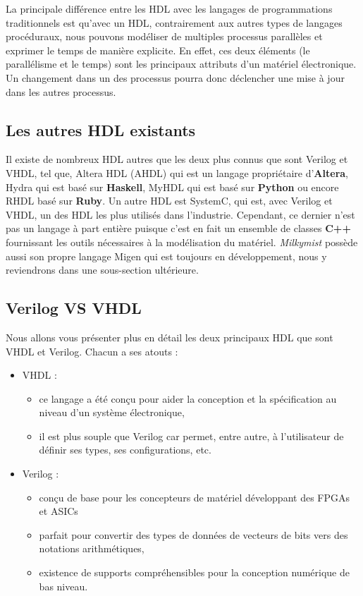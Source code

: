 La principale différence entre les HDL avec les langages de programmations traditionnels est qu'avec un HDL, contrairement aux autres types de langages procéduraux, nous pouvons modéliser de multiples processus parallèles et exprimer le temps de manière explicite. En effet, ces deux éléments (le parallélisme et le temps) sont les principaux attributs d'un matériel électronique. Un changement dans un des processus pourra donc déclencher une mise à jour dans les autres processus.

\subsection{Les autres HDL existants}
Il existe de nombreux HDL autres que les deux plus connus que sont Verilog et VHDL, tel que, Altera HDL (AHDL) qui est un langage propriétaire d'\textbf{Altera}, Hydra qui est basé sur \textbf{Haskell}, MyHDL qui est basé sur \textbf{Python} ou encore RHDL basé sur \textbf{Ruby}. Un autre HDL est SystemC, qui est, avec Verilog et VHDL, un des HDL les plus utilisés dans l'industrie. Cependant, ce dernier n'est pas un langage à part entière puisque c'est en fait un ensemble de classes \textbf{C++} fournissant les outils nécessaires à la modélisation du matériel. \textit{Milkymist} possède aussi son propre langage Migen qui est toujours en développement, nous y reviendrons dans une sous-section ultérieure.

\subsection{Verilog VS VHDL}
\vspace{15px}
Nous allons vous présenter plus en détail les deux principaux HDL que sont VHDL et Verilog. Chacun a ses atouts :
\begin{itemize}
\item VHDL :
\begin{itemize}
\item ce langage a été conçu pour aider la conception et la spécification au niveau d'un système électronique,
\item il est plus souple que Verilog car permet, entre autre, à l'utilisateur de définir ses types, ses configurations, etc.
\end{itemize}
\item Verilog :
\begin{itemize}
\item conçu de base pour les concepteurs de matériel développant des FPGAs et ASICs
\item parfait pour convertir des types de données de vecteurs de bits vers des notations arithmétiques,
\item existence de supports compréhensibles pour la conception numérique de bas niveau.
\end{itemize}
\end{itemize}

